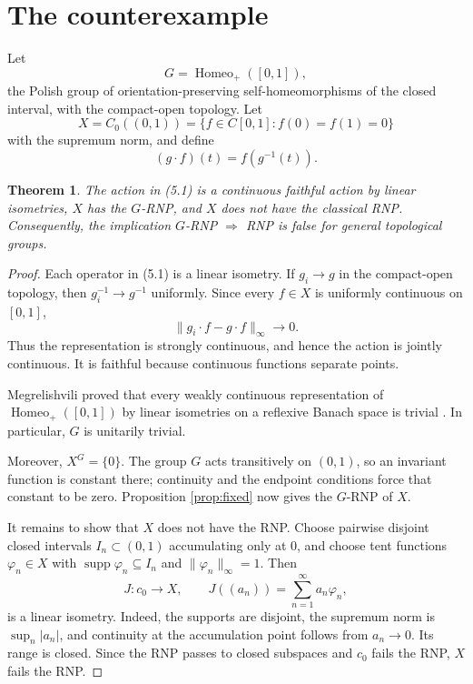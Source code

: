 \documentclass[11pt]{article}
\newtheorem{theorem}{Theorem}[section]
\theoremstyle{remark}
\newcommand{\Homeo}{\operatorname{Homeo}}
\newcommand{\supp}{\operatorname{supp}}
\begin{document}
\section{The counterexample}

Let
\[
 G=\Homeo_+([0,1]),
\]
the Polish group of orientation-preserving self-homeomorphisms of the closed
interval, with the compact-open topology.  Let
\[
 X=C_0((0,1))
 =\{f\in C[0,1]:f(0)=f(1)=0\}
\]
with the supremum norm, and define
\begin{equation*}
 (g\cdot f)(t)=f(g^{-1}(t)).
 \tag{5.1}
\end{equation*}

\begin{theorem}\label{thm:counterexample}
The action in (5.1) is a continuous faithful action by linear isometries,
$X$ has the $G$-RNP, and $X$ does not have the classical RNP.  Consequently,
the implication $G$-RNP $\Rightarrow$ RNP is false for general topological
groups.
\end{theorem}

\begin{proof}
Each operator in (5.1) is a linear isometry.  If $g_i\to g$ in the
compact-open topology, then $g_i^{-1}\to g^{-1}$ uniformly.  Since every
$f\in X$ is uniformly continuous on $[0,1]$,
\[
 \|g_i\cdot f-g\cdot f\|_\infty\longrightarrow0.
\]
Thus the representation is strongly continuous, and hence the action is
jointly continuous.  It is faithful because continuous functions separate
points.

Megrelishvili proved that every weakly continuous representation of
$\Homeo_+([0,1])$ by linear isometries on a reflexive Banach space is trivial
\cite{Megrelishvili}.  In particular, $G$ is unitarily trivial.

Moreover, $X^G=\{0\}$.  The group $G$ acts transitively on $(0,1)$, so an
invariant function is constant there; continuity and the endpoint conditions
force that constant to be zero.  Proposition \ref{prop:fixed} now gives the
$G$-RNP of $X$.

It remains to show that $X$ does not have the RNP.  Choose pairwise disjoint
closed intervals $I_n\subset(0,1)$ accumulating only at $0$, and choose tent
functions $\varphi_n\in X$ with
$\supp\varphi_n\subseteq I_n$ and $\|\varphi_n\|_\infty=1$.  Then
\[
 J:c_0\longrightarrow X,
 \qquad J((a_n))=\sum_{n=1}^\infty a_n\varphi_n,
\]
is a linear isometry.  Indeed, the supports are disjoint, the supremum norm
is $\sup_n|a_n|$, and continuity at the accumulation point follows from
$a_n\to0$.  Its range is closed.  Since the RNP passes to closed subspaces
and $c_0$ fails the RNP, $X$ fails the RNP.
\end{proof}
\end{document}
